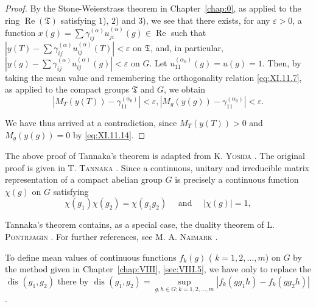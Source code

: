 \begin{proof}
By the Stone-Weierstrass theorem in Chapter~\ref{chap:0}, as applied to the ring $\operatorname{Re}(\mathfrak{T})$ satisfying $1$), $2$) and $3$), we see that there exists, for any $\varepsilon > 0$, a function $x(g) = \sum \gamma_{ij}^{(\alpha)} u_{ji}^{(\alpha)}(g) \in \operatorname{Re}$ such that $|y(T) - \sum \gamma_{ij}^{(\alpha)} u_{ij}^{(\alpha)}(T)| < \varepsilon$ on $\mathfrak{T}$, and, in particular, $|y(g) - \sum \gamma_{ij}^{(\alpha)} u_{ij}^{(\alpha)}(g)| < \varepsilon$ on $G$. Let $u_{11}^{(\alpha_n)}(g) = u(g) = 1$. Then, by taking the mean value and remembering the orthogonality relation \eqref{eq:XI.11.7}, as applied to the compact groups $\mathfrak{T}$ and $G$, we obtain 
\begin{equation}\label{eq:XI.11.15}
\left| M _{T} (y (T)) - \gamma_{11} ^ {\left(\alpha_{0}\right)} \right| < \varepsilon , \left| M _{g} (y (g)) - \gamma_{11} ^ {\left(\alpha_{0}\right)} \right| < \varepsilon .
\end{equation}

We have thus arrived at a contradiction, since $M_T(y(T)) > 0$ and $M_g(y(g)) = 0$ by \eqref{eq:XI.11.14}. 
\end{proof}
\begin{remarkn}[Remark $1$] The above proof of Tannaka's theorem is adapted from K. \textsc{Yosida} \cite{yosida357}. The original proof is given in T. \textsc{Tannaka} \cite{tannaka320}. Since a continuous, unitary and irreducible matrix representation of a compact abelian group $G$ is precisely a continuous function $\chi(g)$ on $G$ satisfying 
\[
\chi \left(g _{1}\right) \chi \left(g _{2}\right) = \chi \left(g _{1} g _{2}\right) \quad \text{ and } \quad | \chi (g) | = 1,
\]
\end{remarkn}

Tannaka's theorem contains, as a special case, the duality theorem of L. \textsc{Pontrjagin} \cite{pontrjagin263}. For further references, see M. A. \textsc{Naimark} \cite{naimark221}. 

\begin{remarkn}[Remark $2$] To define mean values of continuous functions $f_{k}(g)$ ( $k = 1, 2, \ldots, m$) on $G$ by the method given in Chapter~\ref{chap:VIII}, \ref{sec:VIII.5}, we have only to replace the $\text{ dis }(g_1, g_2)$ there by $\text{ dis }(g_1, g_2) = \sup\limits_{g, h \in G; k=1,2,\ldots,m} |f_k(g g_1 h) - f_k(g g_2 h)|$. 
\end{remarkn}


\label{sec:XI.12}

